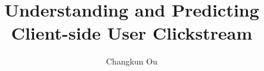 \documentclass[11pt,a4paper,twoside]{article}
\title{Understanding and Predicting\\Client-side User Clickstream}
\author{Changkun Ou}
\begin{document}
\makecover
\makeaufgabenstellung
\makededication
\makeabstract
\maketoc
\cleardoublepage












\end{document}
